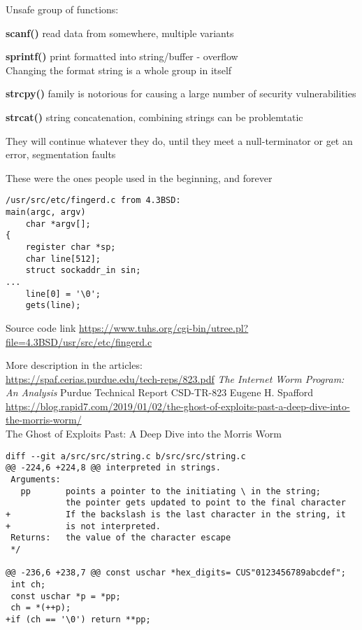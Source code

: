 \documentclass[Screen16to9,17pt]{foils}
\begin{document}

 Unsafe group of functions:
\begin{list2}
\item {\bf scanf()} read data from somewhere, multiple variants
\item {\bf sprintf()} print formatted into string/buffer - overflow\\
Changing the format string is a whole group in itself
\item {\bf strcpy()} family is notorious for causing a large number of security vulnerabilities
\item {\bf strcat()} string concatenation, combining strings can be problemtatic
\end{list2}

They will continue whatever they do, until they meet a null-terminator or get an error, segmentation faults
\vskip 1cm
\centerline{These were the ones people used in the beginning, and forever}



\begin{verbatim}
/usr/src/etc/fingerd.c from 4.3BSD:
main(argc, argv)
	char *argv[];
{
	register char *sp;
	char line[512];
	struct sockaddr_in sin;
...
	line[0] = '\0';
	gets(line);
\end{verbatim}

Source code link \url{https://www.tuhs.org/cgi-bin/utree.pl?file=4.3BSD/usr/src/etc/fingerd.c}

More description in the articles:\\
{\footnotesize\url{https://spaf.cerias.purdue.edu/tech-reps/823.pdf}} \emph{The Internet Worm Program: An Analysis}
Purdue Technical Report CSD-TR-823
Eugene H. Spafford\\ {\footnotesize\url{https://blog.rapid7.com/2019/01/02/the-ghost-of-exploits-past-a-deep-dive-into-the-morris-worm/}}\\ The Ghost of Exploits Past: A Deep Dive into the Morris Worm



\begin{verbatim}
diff --git a/src/src/string.c b/src/src/string.c
@@ -224,6 +224,8 @@ interpreted in strings.
 Arguments:
   pp       points a pointer to the initiating \ in the string;
            the pointer gets updated to point to the final character
+           If the backslash is the last character in the string, it
+           is not interpreted.
 Returns:   the value of the character escape
 */

@@ -236,6 +238,7 @@ const uschar *hex_digits= CUS"0123456789abcdef";
 int ch;
 const uschar *p = *pp;
 ch = *(++p);
+if (ch == '\0') return **pp;
\end{verbatim}
\end{document}

